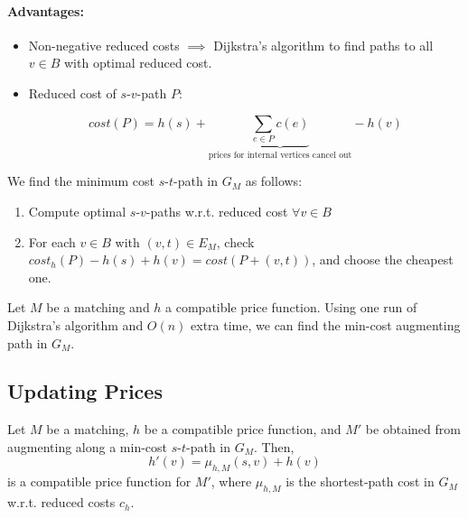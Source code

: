 \paragraph{Advantages:}
\begin{itemize}
\item Non-negative reduced costs $\implies$ Dijkstra's algorithm to find paths to all $v \in B$ with optimal reduced cost.
\item Reduced cost of $s$-$v$-path $P$:

$${cost}(P) = h(s) + \underbrace{\sum_{e \in P}c(e)}_\text{prices for internal vertices cancel out} - h(v)$$
\end{itemize}

We find the minimum cost $s$-$t$-path in $G_M$ as follows:
\begin{enumerate}
\item Compute optimal $s$-$v$-paths w.r.t. reduced cost $\forall v \in B$
\item For each $v \in B$ with $(v,t) \in E_M$, check ${cost}_h(P) - h(s) + h(v) = {cost}(P + (v,t))$, and choose the cheapest one. 
\end{enumerate}

\begin{mylemma}
Let $M$ be a matching and $h$ a compatible price function. Using one run of Dijkstra's algorithm and $O(n)$ extra time, we can find the min-cost augmenting path in $G_M$.
\end{mylemma}

\subsection{Updating Prices}

\begin{mylemma}
Let $M$ be a matching, $h$ be a compatible price function, and $M'$ be obtained from augmenting along a min-cost $s$-$t$-path in $G_M$. Then,
$$h'(v) = \mu_{h,M} (s,v) + h(v)$$
is a compatible price function for $M'$, where $\mu_{h,M}$ is the shortest-path cost in $G_M$ w.r.t. reduced costs $c_h$.
\end{mylemma}


